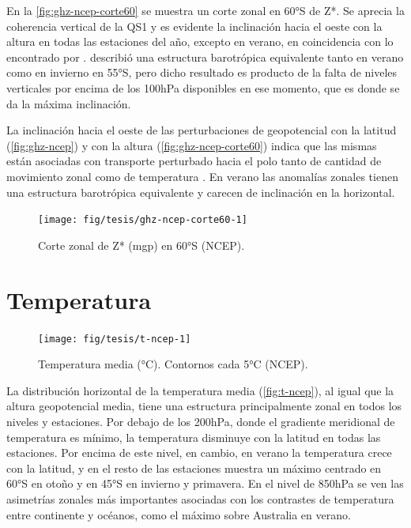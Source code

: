 \documentclass[spanish,a4paper,12pt,oneside]{book}
\begin{document}
En la \autoref{fig:ghz-ncep-corte60} se muestra un corte zonal en 60°S
de Z*. Se aprecia la coherencia vertical de la QS1 y es evidente la
inclinación hacia el oeste con la altura en todas las estaciones del
año, excepto en verano, en coincidencia con lo encontrado por
\citet{Quintanar1995a}. \citet{Karoly1985} describió una estructura
barotrópica equivalente tanto en verano como en invierno en 55°S, pero
dicho resultado es producto de la falta de niveles verticales por encima
de los 100hPa disponibles en ese momento, que es donde se da la máxima
inclinación.

La inclinación hacia el oeste de las perturbaciones de geopotencial con
la latitud (\autoref{fig:ghz-ncep}) y con la altura
(\autoref{fig:ghz-ncep-corte60}) indica que las mismas están asociadas
con transporte perturbado hacia el polo tanto de cantidad de movimiento
zonal como de temperatura \citep{James}. En verano las anomalías zonales
tienen una estructura barotrópica equivalente y carecen de inclinación
en la horizontal.

\begin{figure}
\texttt{[image: fig/tesis/ghz-ncep-corte60-1]} \caption{Corte zonal de Z* (mgp) en 60°S (NCEP).}\label{fig:ghz-ncep-corte60}
\end{figure}

\hypertarget{temperatura}{%
\section{Temperatura}\label{temperatura}}

\begin{landscape}\begin{figure}

{\centering \texttt{[image: fig/tesis/t-ncep-1]} 

}

\caption{Temperatura media (°C). Contornos cada 5°C (NCEP).}\label{fig:t-ncep}
\end{figure}
\end{landscape}

La distribución horizontal de la temperatura media
(\autoref{fig:t-ncep}), al igual que la altura geopotencial media, tiene
una estructura principalmente zonal en todos los niveles y estaciones.
Por debajo de los 200hPa, donde el gradiente meridional de temperatura
es mínimo, la temperatura disminuye con la latitud en todas las
estaciones. Por encima de este nivel, en cambio, en verano la
temperatura crece con la latitud, y en el resto de las estaciones
muestra un máximo centrado en 60°S en otoño y en 45°S en invierno y
primavera. En el nivel de 850hPa se ven las asimetrías zonales más
importantes asociadas con los contrastes de temperatura entre continente
y océanos, como el máximo sobre Australia en verano.
\end{document}
